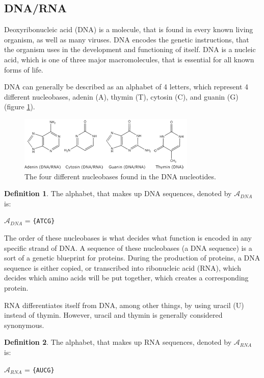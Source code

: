 \documentclass[12pt]{article}
\theoremstyle{definition}
\newtheorem{mydef}{Definition}
\begin{document}
\subsection{DNA/RNA}

Deoxyribonucleic acid (DNA) is a molecule, that is found in every known living organism, as well as many viruses. DNA encodes the genetic instructions, that the organism uses in the development and functioning of itself. DNA is a nucleic acid, which is one of three major macromolecules, that is essential for all known forms of life.

DNA can generally be described as an alphabet of 4 letters, which represent 4 different nucleobases, adenin (A), thymin (T), cytosin (C), and guanin (G) (figure \ref{dnabases}).

\begin{figure}[H]
\label{dnabases}
\begin{center}
	\includegraphics[scale=4]{dnabaserne.png}
\end{center}
\caption{The four different nucleobases found in the DNA nucleotides.\cite{DNA-biotechacademy}}
\end{figure}

\begin{mydef}
The alphabet, that makes up DNA sequences, denoted by $\mathcal{A}_{DNA}$ is:
\begin{center}
$\mathcal{A}_{DNA}$ = \texttt{\{ATCG\}}
\end{center}
\end{mydef}

The order of these nucleobases is what decides what function is encoded in any specific strand of DNA. A sequence of these nucleobases (a DNA sequence) is a sort of a genetic blueprint for proteins. During the production of proteins, a DNA sequence is either copied, or transcribed into ribonucleic acid (RNA), which decides which amino acids will be put together, which creates a corresponding protein.

RNA differentiates itself from DNA, among other things, by using uracil (U) instead of thymin. However, uracil and thymin is generally considered synonymous.

\begin{mydef}
The alphabet, that makes up RNA sequences, denoted by $\mathcal{A}_{RNA}$ is:
\begin{center}
$\mathcal{A}_{RNA}$ = \texttt{\{AUCG\}}
\end{center}
\end{mydef}
\end{document}
